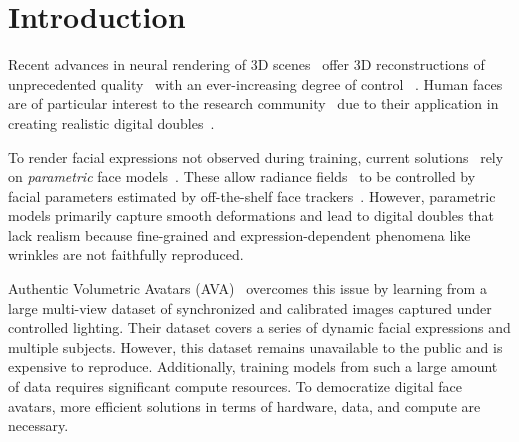 \section{Introduction}
  \label{sec:blendfields-intro}


  Recent advances in neural rendering of 3D scenes~\cite{tewari2022advances}
  offer 3D reconstructions of unprecedented quality~\cite{mildenhall2020nerf}
  with an ever-increasing degree of control ~\cite{kania2022conerf,
  liu2021editing}.
  Human faces are of particular interest to the research
  community~\cite{athar2022rignerf, gafni2021dynamic, garbin2024voltemorph,
  gao2022reconstructing} due to their application in creating realistic
  digital doubles~\cite{ma2021pixel, tewari2022advances, zhang2022avatargen,
  zhi2022dualspace}.

  To render facial expressions not observed during training, current
  solutions~\cite{athar2022rignerf, gafni2021dynamic, garbin2024voltemorph,
  gao2022reconstructing} rely on \textit{parametric} face
  models~\cite{blanz1999morphable}.
  These allow radiance fields~\cite{mildenhall2020nerf} to be controlled by
  facial parameters estimated by off-the-shelf face
  trackers~\cite{li2017flame}.
  However, parametric models primarily capture smooth deformations and lead to
  digital doubles that lack realism because fine-grained and
  expression-dependent phenomena like wrinkles are not faithfully reproduced.

  Authentic Volumetric Avatars (AVA)~\cite{cao2022authentic} overcomes this
  issue by learning from a large multi-view dataset of synchronized and
  calibrated images captured under controlled lighting.
  Their dataset covers a series of dynamic facial expressions and multiple
  subjects.
  However, this dataset remains unavailable to the public and is expensive to
  reproduce.
  Additionally, training models from such a large amount of data requires
  significant compute resources.
  To democratize digital face avatars, more efficient solutions in terms of
  hardware, data, and compute are necessary.

